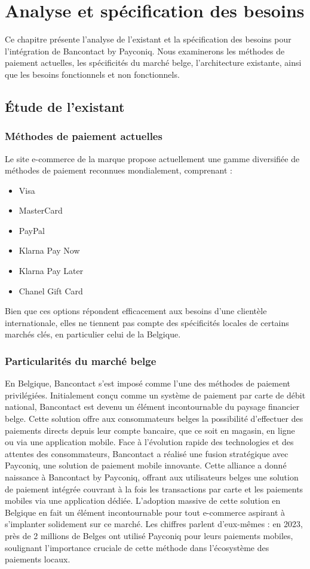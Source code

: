 
\chapter{Analyse et spécification des besoins}
\label{chap:Analyse et spécification des besoins}

Ce chapitre présente l'analyse de l'existant et la spécification des besoins pour l'intégration de Bancontact by Payconiq. Nous examinerons les méthodes de paiement actuelles, les spécificités du marché belge, l'architecture existante, ainsi que les besoins fonctionnels et non fonctionnels.
\pagebreak

\section{Étude de l’existant}
\subsection{Méthodes de paiement actuelles}
Le site e-commerce de la marque propose actuellement une gamme diversifiée de méthodes de paiement reconnues mondialement, comprenant :
\begin{itemize}
    \item Visa
    \item MasterCard
    \item PayPal
    \item Klarna Pay Now
    \item Klarna Pay Later
    \item Chanel Gift Card
\end{itemize}
Bien que ces options répondent efficacement aux besoins d'une clientèle internationale, elles ne tiennent pas compte des spécificités locales de certains marchés clés, en particulier celui de la Belgique.
\subsection{Particularités du marché belge}
En Belgique, Bancontact s'est imposé comme l'une des méthodes de paiement privilégiées. Initialement conçu comme un système de paiement par carte de débit national, Bancontact est devenu un élément incontournable du paysage financier belge. Cette solution offre aux consommateurs belges la possibilité d'effectuer des paiements directs depuis leur compte bancaire, que ce soit en magasin, en ligne ou via une application mobile.
Face à l'évolution rapide des technologies et des attentes des consommateurs, Bancontact a réalisé une fusion stratégique avec Payconiq, une solution de paiement mobile innovante. Cette alliance a donné naissance à Bancontact by Payconiq, offrant aux utilisateurs belges une solution de paiement intégrée couvrant à la fois les transactions par carte et les paiements mobiles via une application dédiée.
L'adoption massive de cette solution en Belgique en fait un élément incontournable pour tout e-commerce aspirant à s'implanter solidement sur ce marché. Les chiffres parlent d'eux-mêmes : en 2023, près de 2 millions de Belges ont utilisé Payconiq pour leurs paiements mobiles, soulignant l'importance cruciale de cette méthode dans l'écosystème des paiements locaux.

